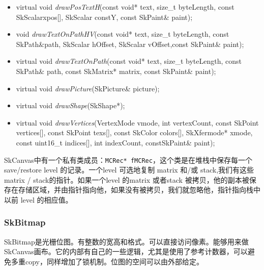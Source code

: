\begin{enumerate}
\begin{itemize}
  \item virtual void \textit{drawPosTextH}(const void* text, size\_t byteLength, const SkScalarxpos[], SkScalar constY, const SkPaint\& paint);
  \item void \textit{drawTextOnPathHV}(const void* text, size\_t byteLength, const SkPath\&path, SkScalar hOffset, SkScalar vOffset,const SkPaint\& paint);
  \item virtual void \textit{drawTextOnPath}(const void* text, size\_t byteLength, const SkPath\& path, const SkMatrix* matrix, const SkPaint\& paint);
  \item virtual void \textit{drawPicture}(SkPicture\& picture);
  \item virtual void \textit{drawShape}(SkShape*);
  \item virtual void \textit{drawVertices}(VertexMode vmode, int vertexCount, const SkPoint vertices[], const SkPoint texs[], const SkColor colors[], SkXfermode* xmode, const uint16\_t indices[], int indexCount, constSkPaint\& paint);
  \end{itemize}

\end{enumerate}

SkCanvas中有一个私有类成员：\verb|MCRec* fMCRec|，这个类是在堆栈中保存每一个 save/restore level 的记录。一个level 可选地复制 matrix 和/或 stack,我们有这些matrix / stack的指针。如果一个level 的matrix 或者stack 被拷贝，他的副本被保存在存储区域，并由指针指向他，如果没有被拷贝，我们就忽略他，指针指向栈中以前 level 的相应值。

\subsubsection{SkBitmap}
\label{sec:skia-skbitmap}
SkBitmap是光栅位图。有整数的宽高和格式。可以直接访问像素。能够用来做SkCanvas画布。它的内部有自己的一些逻辑，尤其是使用了参考计数器，可以避免多重copy，同样增加了锁机制。位图的空间可以由外部给定。

